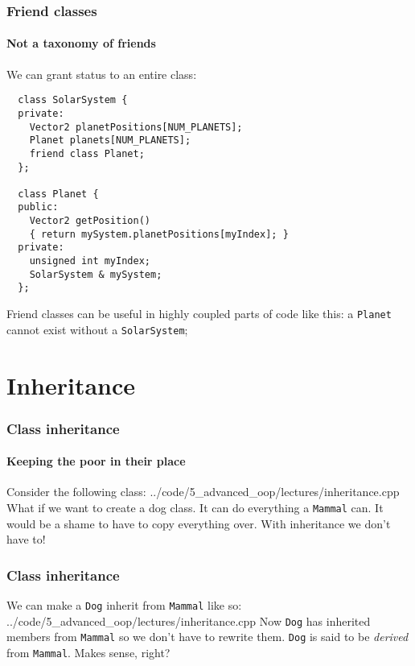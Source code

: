 \documentclass{beamer}
\begin{document}
\begin{frame}[fragile]
  \frametitle{Friend classes}
  \framesubtitle{Not a taxonomy of friends}
  
  We can grant  status to an entire class:
  \begin{lstlisting}
  class SolarSystem {
  private:
    Vector2 planetPositions[NUM_PLANETS];
    Planet planets[NUM_PLANETS];
    friend class Planet;
  };
  
  class Planet {
  public:
    Vector2 getPosition()
    { return mySystem.planetPositions[myIndex]; }
  private:
    unsigned int myIndex;
    SolarSystem & mySystem;
  };
  \end{lstlisting}
  \pause
  Friend classes can be useful in highly coupled parts of code like this: a \texttt{Planet} cannot exist without a \texttt{SolarSystem};
  

\end{frame}

\section{Inheritance}

\begin{frame}
  \frametitle{Class inheritance}
  \framesubtitle{Keeping the poor in their place}

	Consider the following class:
    {../code/5_advanced_oop/lectures/inheritance.cpp}
    \pause
  What if we want to create a dog class.  It can do everything a \texttt{Mammal} can.  It would be a shame to have to copy everything over.  With inheritance we don't have to!
\end{frame}

\begin{frame}
  \frametitle{Class inheritance}

  We can make a \texttt{Dog} inherit from \texttt{Mammal} like so:
    {../code/5_advanced_oop/lectures/inheritance.cpp}
  \pause
  Now \texttt{Dog} has inherited members from \texttt{Mammal} so we don't have to rewrite them.  \texttt{Dog} is said to be \textit{derived} from \texttt{Mammal}. Makes sense, right?
\end{frame}
\end{document}
